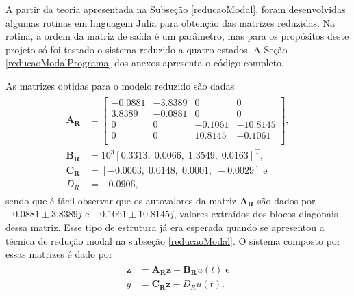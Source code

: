 A partir da teoria apresentada na Subseção \ref{reducaoModal}, foram desenvolvidas algumas rotinas em linguagem Julia \cite{julia} para obtenção das matrizes reduzidas. Na rotina, a ordem da matriz de saída é um parâmetro, mas para os propósitos deste projeto só foi testado o sistema reduzido a quatro estados. A Seção \ref{reducaoModalPrograma} dos anexos apresenta o código completo.

As matrizes obtidas para o modelo reduzido são dadas \begin{align}
\begin{array}{ll}
	\mathbf{A_R} &= \left[\begin{array}{cccc}
		-0.0881  & -3.8389 &         0 &         0\\
    3.8389 &   -0.0881 &         0 &         0\\
         0 &         0 &   -0.1061 &  -10.8145\\
         0 &        0 &   10.8145 &   -0.1061\\
	\end{array}\right],\\
	\mathbf{B_R} &= 10^3\left[0.3313,\;
    0.0066,\;
    1.3549,\;
    0.0163\right]^{\mathrm{T}},\\
	\mathbf{C_R} &= \left[-0.0003,\;0.0148,\;0.0001,\;-0.0029\right]\;\mathrm{e}\\
	D_R &= -0.0906,
\end{array} \label{modeloReduzidoSemEpsilon}
\end{align} sendo que é fácil observar que os autovalores da matriz $\mathbf{A_R}$ são dados por $-0.0881\pm 3.8389j$ e $-0.1061\pm 10.8145j$, valores extraídos dos blocos diagonais dessa matriz. Esse tipo de estrutura já era esperada quando se apresentou a técnica de redução modal na subseção \ref{reducaoModal}. O sistema composto por essas matrizes é dado por \begin{align}
	\begin{array}{ll}
		\mathbf{\dot{z}} &= \mathbf{A_R}\mathbf{z} + \mathbf{B_R}u(t)\;\mathrm{e}\\
		y &= \mathbf{C_R}\mathbf{z} + D_Ru(t).
	\end{array}\label{modeloEspacoDeEstadosSemAtraso}
\end{align}


